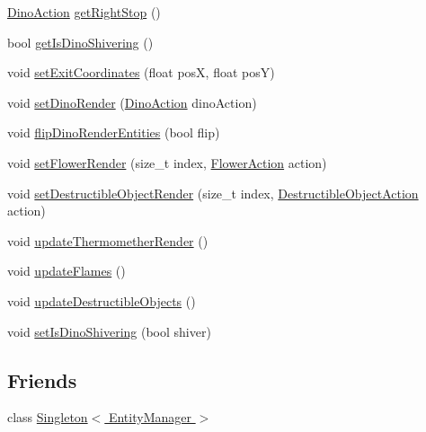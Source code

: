\begin{DoxyCompactItemize}
\item 
\hyperlink{namespace_symp_a303925db810fa122d017c4001bfa5e88}{Dino\-Action} \hyperlink{class_symp_1_1_entity_manager_a43d0eb59800de0b2422b5b0f95d2c08f}{get\-Right\-Stop} ()
\item 
bool \hyperlink{class_symp_1_1_entity_manager_a52b4c798c895aa7f77ce228107f1d6c8}{get\-Is\-Dino\-Shivering} ()
\item 
void \hyperlink{class_symp_1_1_entity_manager_abc616919576f3f934b0a3a894fbf73ce}{set\-Exit\-Coordinates} (float pos\-X, float pos\-Y)
\item 
void \hyperlink{class_symp_1_1_entity_manager_af4c4ae3b2fbbaf6d8230a581928533a5}{set\-Dino\-Render} (\hyperlink{namespace_symp_a303925db810fa122d017c4001bfa5e88}{Dino\-Action} dino\-Action)
\item 
void \hyperlink{class_symp_1_1_entity_manager_aee82c43f4077bafd9bab82afebde8c52}{flip\-Dino\-Render\-Entities} (bool flip)
\item 
void \hyperlink{class_symp_1_1_entity_manager_a0688e53ec03ddb4175b373575c5e0054}{set\-Flower\-Render} (size\-\_\-t index, \hyperlink{namespace_symp_a2b868de1f6f86f455f39dfa63028859c}{Flower\-Action} action)
\item 
void \hyperlink{class_symp_1_1_entity_manager_a97c9577c4f459e3a08465caf45f25853}{set\-Destructible\-Object\-Render} (size\-\_\-t index, \hyperlink{namespace_symp_a9f891c0e98f2864e7b687d741bf032d7}{Destructible\-Object\-Action} action)
\item 
void \hyperlink{class_symp_1_1_entity_manager_a1dd7c6251093f5d6cd64460916c8cbbb}{update\-Thermomether\-Render} ()
\item 
void \hyperlink{class_symp_1_1_entity_manager_a4df159993061bc3098f6861f715a17c1}{update\-Flames} ()
\item 
void \hyperlink{class_symp_1_1_entity_manager_af4d70469e46f2c8473aa877e1acff635}{update\-Destructible\-Objects} ()
\item 
void \hyperlink{class_symp_1_1_entity_manager_a555efd00fbf09f062b22f463d49a6e22}{set\-Is\-Dino\-Shivering} (bool shiver)
\end{DoxyCompactItemize}
\subsection*{Friends}
\begin{DoxyCompactItemize}
\item 
class \hyperlink{class_symp_1_1_entity_manager_a275303a889d60f5019ba1b3f2d529c6b}{Singleton$<$ Entity\-Manager $>$}
\end{DoxyCompactItemize}
